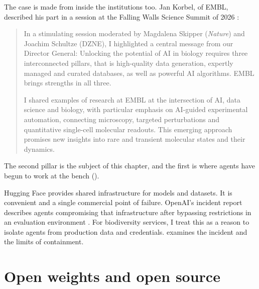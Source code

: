 The case is made from inside the institutions too. Jan Korbel, of EMBL,
described his part in a session at the Falling Walls Science Summit of 2026
\parencite{korbel2026pillars}:

\begin{quote}
In a stimulating session moderated by Magdalena Skipper (\emph{Nature}) and
Joachim Schultze (DZNE), I highlighted a central message from our Director
General: Unlocking the potential of AI in biology requires three interconnected pillars,
that is high-quality data generation, expertly managed and curated databases,
as well as powerful AI algorithms. EMBL brings strengths in all three.

I shared examples of research at EMBL at the intersection of AI, data science
and biology, with particular emphasis on AI-guided experimental automation,
connecting microscopy, targeted perturbations and quantitative single-cell
molecular readouts. This emerging approach promises new insights into rare and
transient molecular states and their dynamics.
\end{quote}

The second pillar is the subject of this chapter, and the first is where
agents have begun to work at the bench ().

Hugging Face provides shared infrastructure for models and datasets. It is
convenient and a single commercial point of failure. OpenAI's incident report
describes agents compromising that infrastructure after bypassing restrictions
in an evaluation environment \parencite{openai2026huggingface}. For
biodiversity services, I treat this as a reason to isolate agents from
production data and credentials.  examines the incident and
the limits of containment.

\section{Open weights and open source}

